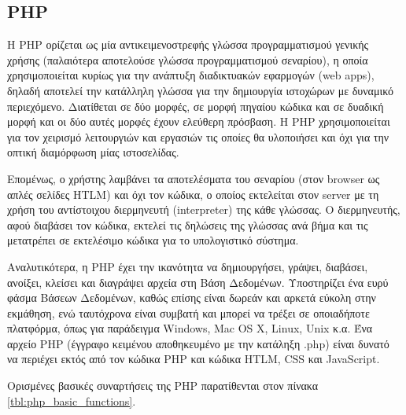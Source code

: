 \subsection{PHP}
Η PHP ορίζεται ως μία αντικειμενοστρεφής γλώσσα προγραμματισμού γενικής χρήσης (παλαιότερα αποτελούσε γλώσσα προγραμματισμού σεναρίου), η οποία χρησιμοποιείται κυρίως για την ανάπτυξη διαδικτυακών εφαρμογών (web apps), δηλαδή αποτελεί την κατάλληλη γλώσσα για την δημιουργία ιστοχώρων με δυναμικό περιεχόμενο. Διατίθεται σε δύο μορφές, σε μορφή πηγαίου κώδικα και σε δυαδική μορφή και οι δύο αυτές μορφές έχουν ελεύθερη πρόσβαση. Η PHP χρησιμοποιείται για τον χειρισμό λειτουργιών και εργασιών τις οποίες θα υλοποιήσει και όχι για την οπτική διαμόρφωση μίας ιστοσελίδας.

Επομένως, ο χρήστης λαμβάνει τα αποτελέσματα του σεναρίου (στον browser ως απλές σελίδες HTLM) και όχι τον κώδικα, ο οποίος εκτελείται στον server με τη χρήση του αντίστοιχου διερμηνευτή (interpreter) της κάθε γλώσσας. Ο διερμηνευτής, αφού διαβάσει τον κώδικα, εκτελεί τις δηλώσεις της γλώσσας ανά βήμα και τις μετατρέπει σε εκτελέσιμο κώδικα για το υπολογιστικό σύστημα.

Αναλυτικότερα, η PHP έχει την ικανότητα να δημιουργήσει, γράψει, διαβάσει, ανοίξει, κλείσει και διαγράψει αρχεία στη Βάση Δεδομένων. Υποστηρίζει ένα ευρύ φάσμα Βάσεων Δεδομένων, καθώς επίσης είναι δωρεάν και αρκετά εύκολη στην εκμάθηση, ενώ ταυτόχρονα είναι συμβατή και μπορεί να τρέξει σε οποιαδήποτε πλατφόρμα, όπως για παράδειγμα Windows, Mac OS X, Linux, Unix κ.α. Ένα αρχείο PHP (έγγραφο κειμένου αποθηκευμένο με την κατάληξη .php) είναι δυνατό να περιέχει εκτός από τον κώδικα PHP και κώδικα HTLM, CSS και JavaScript.

Ορισμένες βασικές συναρτήσεις της PHP παρατίθενται στον πίνακα \ref{tbl:php_basic_functions}.

